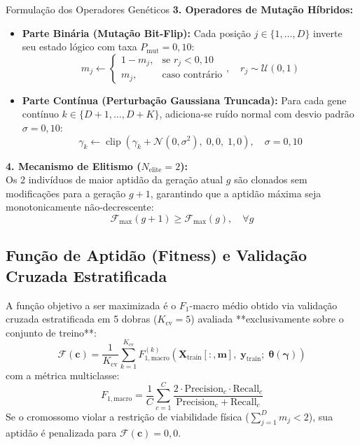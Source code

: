 \documentclass[11pt,a4paper]{article}
\begin{document}
\begin{mathBox}{Formulação dos Operadores Genéticos}
\textbf{3. Operadores de Mutação Híbridos:}\\
\begin{itemize}
  \item \textbf{Parte Binária (Mutação Bit-Flip):} Cada posição $j \in \{1, \dots, D\}$ inverte seu estado lógico com taxa $P_{\text{mut}} = 0{,}10$:
  \begin{equation}
    m_j \gets \begin{cases} 1 - m_j, & \text{se } r_j < 0{,}10 \\ m_j, & \text{caso contrário} \end{cases}, \quad r_j \sim \mathcal{U}(0, 1)
  \end{equation}
  \item \textbf{Parte Contínua (Perturbação Gaussiana Truncada):} Para cada gene contínuo $k \in \{D+1, \dots, D+K\}$, adiciona-se ruído normal com desvio padrão $\sigma = 0{,}10$:
  \begin{equation}
    \gamma_k \gets \operatorname{clip}\left( \gamma_k + \mathcal{N}(0, \sigma^2), \; 0{,}0, \; 1{,}0 \right), \quad \sigma = 0{,}10
  \end{equation}
\end{itemize}

\textbf{4. Mecanismo de Elitismo ($N_{\text{elite}} = 2$):}\\
Os 2 indivíduos de maior aptidão da geração atual $g$ são clonados sem modificações para a geração $g+1$, garantindo que a aptidão máxima seja monotonicamente não-decrescente:
\begin{equation}
  \mathcal{F}_{\max}(g+1) \ge \mathcal{F}_{\max}(g), \quad \forall g
\end{equation}
\end{mathBox}

\subsection{Função de Aptidão (Fitness) e Validação Cruzada Estratificada}
A função objetivo a ser maximizada é o $F_1$-macro médio obtido via validação cruzada estratificada em 5 dobras ($K_{\text{cv}} = 5$) avaliada **exclusivamente sobre o conjunto de treino**:
\begin{equation}
  \mathcal{F}(\mathbf{c}) = \frac{1}{K_{\text{cv}}} \sum_{k=1}^{K_{\text{cv}}} F_{1, \text{macro}}^{(k)}(\mathbf{X}_{\text{train}}[:, \mathbf{m}], \; \mathbf{y}_{\text{train}}; \; \boldsymbol{\theta}(\boldsymbol{\gamma}))
\end{equation}
com a métrica multiclasse:
\begin{equation}
  F_{1, \text{macro}} = \frac{1}{C} \sum_{c=1}^C \frac{2 \cdot \text{Precision}_c \cdot \text{Recall}_c}{\text{Precision}_c + \text{Recall}_c}
\end{equation}
Se o cromossomo violar a restrição de viabilidade física ($\sum_{j=1}^D m_j < 2$), sua aptidão é penalizada para $\mathcal{F}(\mathbf{c}) = 0{,}0$.
\end{document}
